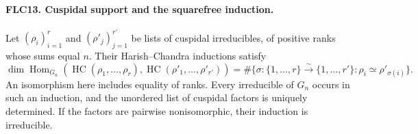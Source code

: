 \documentclass[11pt,a4paper]{article}
\numberwithin{equation}{section}
\theoremstyle{remark}\newtheorem{remark}[theorem]{Remark}
\begin{document}
\paragraph{FLC13. Cuspidal support and the squarefree induction.}
\label{claim:FLC13}
Let $(\rho_i)_{i=1}^r$ and $(\rho'_j)_{j=1}^{r'}$ be lists
of cuspidal irreducibles, of positive ranks whose sums equal
$n$.  Their Harish--Chandra inductions satisfy
\[
 \dim\operatorname{Hom}_{G_n}
       (\operatorname{HC}(\rho_1,\ldots,\rho_r),
        \operatorname{HC}(\rho'_1,\ldots,\rho'_{r'}))
   =\#\{\sigma:\{1,\ldots,r\}\xrightarrow{\sim}
                       \{1,\ldots,r'\}:\rho_i\simeq\rho'_{\sigma(i)}\}.
 \tag{FLC.19}
\]
An isomorphism here includes equality of ranks.
Every irreducible of $G_n$ occurs in such an induction, and
the unordered list of cuspidal factors is uniquely determined.
If the factors are pairwise nonisomorphic, their induction
is irreducible.
\end{document}
